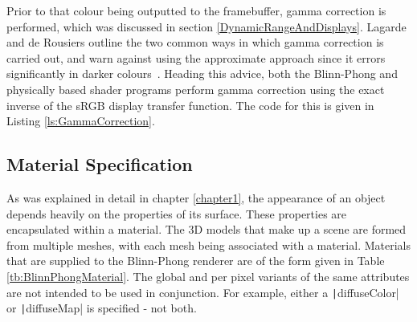 Prior to that colour being outputted to the framebuffer, gamma correction is performed, which was discussed in section \ref{DynamicRangeAndDisplays}. Lagarde and de Rousiers outline the two common ways in which gamma correction is carried out, and warn against using the approximate approach since it errors significantly in darker colours~\cite{MovingFrostbitetoPBR}. Heading this advice, both the Blinn-Phong and physically based shader programs perform gamma correction using the exact inverse of the sRGB display transfer function. The code for this is given in Listing \ref{ls:GammaCorrection}.


\subsection{Material Specification} \label{BlinnPhongRendererMaterialSpecification}

As was explained in detail in chapter \ref{chapter1}, the appearance of an object depends heavily on the properties of its surface. These properties are encapsulated within a material. The 3D models that make up a scene are formed from multiple meshes, with each mesh being associated with a material. Materials that are supplied to the Blinn-Phong renderer are of the form given in Table \ref{tb:BlinnPhongMaterial}. The global and per pixel variants of the same attributes are not intended to be used in conjunction. For example, either a \texttt|diffuseColor| or \texttt|diffuseMap| is specified - not both.

\vspace{20pt}

